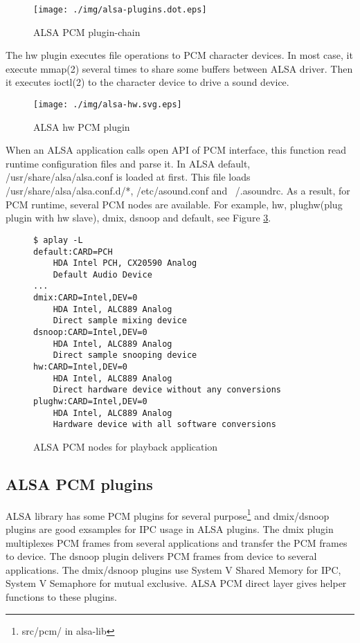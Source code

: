 \documentclass[onecolumn]{article}
\begin{document}
\begin{figure}[htbp]
	\centering
	\texttt{[image: ./img/alsa-plugins.dot.eps]}
	\caption{{ALSA PCM plugin-chain}}
	\label{alsa_plugins}
\end{figure}

The hw plugin executes file operations to PCM character devices. In most case, it execute mmap(2) several times to share some buffers between ALSA driver. Then it executes ioctl(2) to the character device to drive a sound device.

\begin{figure}[htbp]
	\centering
	\texttt{[image: ./img/alsa-hw.svg.eps]}
	\caption{{ALSA hw PCM plugin}}
	\label{fig:alsa-hw-plugin}
\end{figure}

When an ALSA application calls open API of PCM interface, this function read runtime configuration files and parse it. In ALSA default, /usr/share/alsa/alsa.conf is loaded at first. This file loads /usr/share/alsa/alsa.conf.d/*, /etc/asound.conf and ~/.asoundrc. As a result, for PCM runtime, several PCM nodes are available. For example, hw, plughw(plug plugin with hw slave), dmix, dsnoop and default, see Figure \ref{pcm-nodes-playback}.

\begin{figure}[htbp]
\small
\begin{verbatim}
$ aplay -L
default:CARD=PCH
    HDA Intel PCH, CX20590 Analog
    Default Audio Device
...
dmix:CARD=Intel,DEV=0
    HDA Intel, ALC889 Analog
    Direct sample mixing device
dsnoop:CARD=Intel,DEV=0
    HDA Intel, ALC889 Analog
    Direct sample snooping device
hw:CARD=Intel,DEV=0
    HDA Intel, ALC889 Analog
    Direct hardware device without any conversions
plughw:CARD=Intel,DEV=0
    HDA Intel, ALC889 Analog
    Hardware device with all software conversions
\end{verbatim}
\caption{ALSA PCM nodes for playback application}
\label{pcm-nodes-playback}
\end{figure}

\subsection{ALSA PCM plugins}
ALSA library has some PCM plugins for several purpose\footnote{src/pcm/ in alsa-lib} and dmix/dsnoop plugins are good exsamples for IPC usage in ALSA plugins. The dmix plugin multiplexes PCM frames from several applications and transfer the PCM frames to device. The dsnoop plugin delivers PCM frames from device to several applications. The dmix/dsnoop plugins use System V Shared Memory for IPC, System V Semaphore for mutual exclusive. ALSA PCM direct layer gives helper functions to these plugins.
\end{document}

